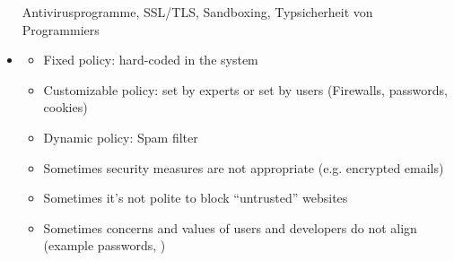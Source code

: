 \documentclass[a4paper,12pt]{scrartcl}
\begin{document}
\begin{itemize}
		Antivirusprogramme, SSL/TLS, Sandboxing, Typsicherheit von Programmiers
	\item
		\begin{itemize}
			\item
				Fixed policy: hard-coded in the system
			\item
				Customizable policy: set by experts or set by users (Firewalls, passwords, cookies)
			\item
				Dynamic policy: Spam filter
			\item
				Sometimes security measures are not appropriate (e.g. encrypted emails)
			\item
				Sometimes it's not polite to block \enquote{untrusted} websites
			\item
				Sometimes concerns and values of users and developers do not align (example passwords, )
		\end{itemize}
\end{itemize}


\end{document}
